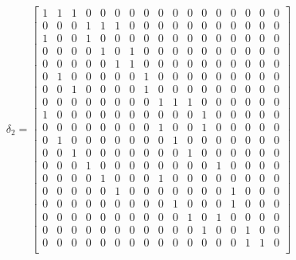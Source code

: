 \documentclass[12pt]{report}
\begin{document}
\begin{enumerate}
$$\delta_2=
\begin{bmatrix}
 1  & 1  & 1  & 0  & 0  & 0  & 0  & 0  & 0  & 0  & 0  & 0  & 0  & 0  & 0  & 0  & 0  \\ %
 0  & 0  & 0  & 1  & 1  & 1  & 0  & 0  & 0  & 0  & 0  & 0  & 0  & 0  & 0  & 0  & 0  \\ %
 1  & 0  & 0  & 1  & 0  & 0  & 0  & 0  & 0  & 0  & 0  & 0  & 0  & 0  & 0  & 0  & 0  \\ %
 0  & 0  & 0  & 0  & 1  & 0  & 1  & 0  & 0  & 0  & 0  & 0  & 0  & 0  & 0  & 0  & 0  \\ %
 0  & 0  & 0  & 0  & 0  & 1  & 1  & 0  & 0  & 0  & 0  & 0  & 0  & 0  & 0  & 0  & 0  \\ %
 0  & 1  & 0  & 0  & 0  & 0  & 0  & 1  & 0  & 0  & 0  & 0  & 0  & 0  & 0  & 0  & 0  \\ %
 0  & 0  & 1  & 0  & 0  & 0  & 0  & 1  & 0  & 0  & 0  & 0  & 0  & 0  & 0  & 0  & 0  \\ %
 0  & 0  & 0  & 0  & 0  & 0  & 0  & 0  & 1  & 1  & 1  & 0  & 0  & 0  & 0  & 0  & 0  \\ %
 1  & 0  & 0  & 0  & 0  & 0  & 0  & 0  & 0  & 0  & 0  & 1  & 0  & 0  & 0  & 0  & 0  \\ %
 0  & 0  & 0  & 0  & 0  & 0  & 0  & 0  & 1  & 0  & 0  & 1  & 0  & 0  & 0  & 0  & 0  \\ %
 0  & 1  & 0  & 0  & 0  & 0  & 0  & 0  & 0  & 1  & 0  & 0  & 0  & 0  & 0  & 0  & 0  \\ %
 0  & 0  & 1  & 0  & 0  & 0  & 0  & 0  & 0  & 0  & 1  & 0  & 0  & 0  & 0  & 0  & 0  \\ %
 0  & 0  & 0  & 1  & 0  & 0  & 0  & 0  & 0  & 0  & 0  & 0  & 1  & 0  & 0  & 0  & 0  \\ %
 0  & 0  & 0  & 0  & 1  & 0  & 0  & 0  & 1  & 0  & 0  & 0  & 0  & 0  & 0  & 0  & 0  \\ %
 0  & 0  & 0  & 0  & 0  & 1  & 0  & 0  & 0  & 0  & 0  & 0  & 0  & 1  & 0  & 0  & 0  \\ %
 0  & 0  & 0  & 0  & 0  & 0  & 0  & 0  & 0  & 1  & 0  & 0  & 0  & 1  & 0  & 0  & 0  \\ %
 0  & 0  & 0  & 0  & 0  & 0  & 0  & 0  & 0  & 0  & 1  & 0  & 1  & 0  & 0  & 0  & 0  \\ %
 0  & 0  & 0  & 0  & 0  & 0  & 0  & 0  & 0  & 0  & 0  & 1  & 0  & 0  & 1  & 0  & 0  \\ %
 0  & 0  & 0  & 0  & 0  & 0  & 0  & 0  & 0  & 0  & 0  & 0  & 0  & 0  & 1  & 1  & 0  \\ %

\end{bmatrix}$$
\end{enumerate}
\end{document}
